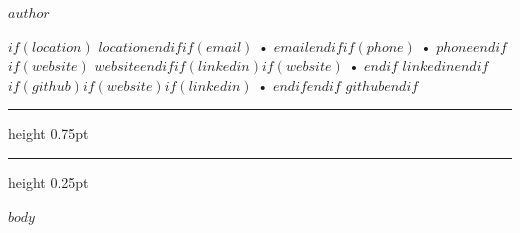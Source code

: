 \documentclass[9pt,letterpaper]{article}
\newcommand{\bluedot}{{\color{primarycolor}•}}
\begin{document}

\noindent
\begin{minipage}[t]{0.30\textwidth}
    \raggedright
    {\fontsize{15}{17}\selectfont\bfseries\color{primarycolor} $author$}
\end{minipage}%
\hfill
\begin{minipage}[t]{0.69\textwidth}
    \raggedleft
    {\fontsize{8.5}{10.5}\selectfont\color{textcolor}
    $if(location)${\color{primarycolor}\faMapMarker*}\hspace{0.15em} $location$$endif$$if(email)$ \bluedot{} {\color{primarycolor}\faEnvelope}\hspace{0.15em} \href{mailto:$email$}{$email$}$endif$$if(phone)$ \bluedot{} {\color{primarycolor}\faPhone}\hspace{0.15em} $phone$$endif$\\[0.1em]
    $if(website)${\color{primarycolor}\faGlobe}\hspace{0.15em} \href{https://$website$}{$website$}$endif$$if(linkedin)$$if(website)$ \bluedot{} $endif${\color{primarycolor}\faLinkedin}\hspace{0.15em} \href{https://$linkedin$}{$linkedin$}$endif$$if(github)$$if(website)$$if(linkedin)$ \bluedot{} $endif$$endif${\color{primarycolor}\faGithub}\hspace{0.15em} \href{https://$github$}{$github$}$endif$
    }
\end{minipage}


\vspace{0.15em}
{\color{primarycolor}\hrule height 0.75pt}
\vspace{0.05em}
{\color{mediumgray}\hrule height 0.25pt}
\vspace{0.3em}

$body$
\end{document}
